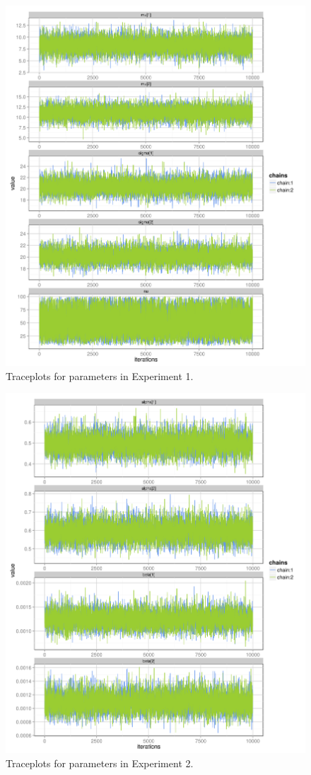\begin{figure}[ht!]
  \centering
  \includegraphics{../figures/main/trace_1.png}
  \caption{Traceplots for parameters in Experiment 1.}
  \label{fig:trace_1}
\end{figure}

\begin{figure}[ht!]
  \centering
  \includegraphics{../figures/main/trace_2.png}
  \caption{Traceplots for parameters in Experiment 2.}
  \label{fig:trace_2}
\end{figure}
